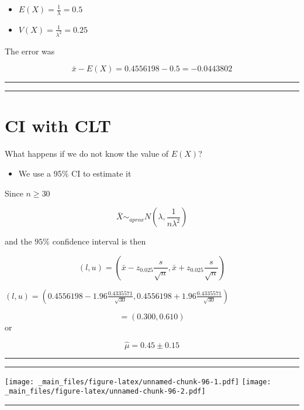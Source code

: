 \documentclass[
]{book}
\providecommand{\tightlist}{%
  \setlength{\itemsep}{0pt}\setlength{\parskip}{0pt}}
\begin{document}
\begin{itemize}
\tightlist
\item
  \(E(X)=\frac{1}{\lambda}=0.5\)
\item
  \(V(X)=\frac{1}{\lambda^2}=0.25\)
\end{itemize}

The error was

\[\bar{x}-E(X)=0.4556198-0.5=-0.0443802\]

\begin{center}\rule{0.5\linewidth}{0.5pt}\end{center}

\begin{center}\rule{0.5\linewidth}{0.5pt}\end{center}

\hypertarget{ci-with-clt}{%
\section{CI with CLT}\label{ci-with-clt}}

What happens if we do not know the value of \(E(X)\)?

\begin{itemize}
\tightlist
\item
  We use a 95\% CI to estimate it
\end{itemize}

Since \(n \geq 30\)

\[\bar{X} \sim_{aprox}  N(\lambda, \frac{1}{n\lambda^2})\]

and the \(95\%\) confidence interval is then

\[(l,u)=(\bar{x}-z_{0.025} \frac{s}{\sqrt{n}}, \bar{x}+z_{0.025} \frac{s}{\sqrt{n}})\]

\((l,u)=(0.4556198-1.96\frac{0.4335571}{\sqrt{30}}, 0.4556198+1.96\frac{0.4335571}{\sqrt{30}})\)

\[=(0.300,0.610)\]
or

\[\hat{\mu}=0.45 \pm 0.15\]

\begin{center}\rule{0.5\linewidth}{0.5pt}\end{center}

\begin{center}\rule{0.5\linewidth}{0.5pt}\end{center}

\texttt{[image: \_main\_files/figure-latex/unnamed-chunk-96-1.pdf]} \texttt{[image: \_main\_files/figure-latex/unnamed-chunk-96-2.pdf]}

\begin{center}\rule{0.5\linewidth}{0.5pt}\end{center}
\end{document}
